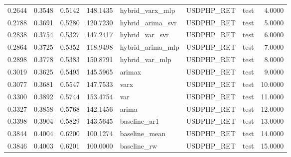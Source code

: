 \begin{tabular}{rrrrlllr}
0.2644 & 0.3548 & 0.5142 & 148.1435 & hybrid_varx_mlp & USDPHP_RET & test & 4.0000 \\
0.2788 & 0.3691 & 0.5280 & 120.7230 & hybrid_arima_svr & USDPHP_RET & test & 5.0000 \\
0.2838 & 0.3754 & 0.5327 & 147.2417 & hybrid_var_svr & USDPHP_RET & test & 6.0000 \\
0.2864 & 0.3725 & 0.5352 & 118.9498 & hybrid_arima_mlp & USDPHP_RET & test & 7.0000 \\
0.2898 & 0.3778 & 0.5383 & 150.8791 & hybrid_var_mlp & USDPHP_RET & test & 8.0000 \\
0.3019 & 0.3625 & 0.5495 & 145.5965 & arimax & USDPHP_RET & test & 9.0000 \\
0.3077 & 0.3681 & 0.5547 & 147.7533 & varx & USDPHP_RET & test & 10.0000 \\
0.3300 & 0.3892 & 0.5744 & 153.4754 & var & USDPHP_RET & test & 11.0000 \\
0.3327 & 0.3858 & 0.5768 & 142.1456 & arima & USDPHP_RET & test & 12.0000 \\
0.3398 & 0.3904 & 0.5829 & 143.5645 & baseline_ar1 & USDPHP_RET & test & 13.0000 \\
0.3844 & 0.4004 & 0.6200 & 100.1274 & baseline_mean & USDPHP_RET & test & 14.0000 \\
0.3846 & 0.4003 & 0.6201 & 100.0000 & baseline_rw & USDPHP_RET & test & 15.0000 \\
\bottomrule
\end{tabular}
